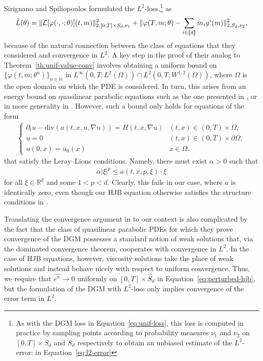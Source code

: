 \documentclass[11pt,reqno]{amsart}
\numberwithin{equation}{section}
\theoremstyle{plain}
\newcommand{\R}{\mathbb{R}}
\newcommand{\sL}{\mathcal{L}}
\newcommand{\N}{\mathbb{N}}
\newcommand{\lbrs}[1]{\llbracket #1 \rrbracket}
\begin{document}
Sirignano and Spiliopoulos \cite{dgm} formulated the $L^2$-loss,\footnote{As with the DGM loss in Equation~\eqref{eq:unif-loss}, this loss is computed in practice by sampling points according to probability measures $\nu_1$ and $\nu_2$ on $[0, T] \times S_d$ and $S_d$ respectively to obtain an unbiased estimate of the $L^2$-error: in Equation~\eqref{eq:l2-error}} as
\begin{align}
\label{eq:l2-error}
    \Tilde{L}(\theta) = \|\sL[\varphi(\cdot, \cdot; \theta)](t,m)\|_{2, [0, T] \times S_d, \nu_1}^2 + \|\varphi(T, m; \theta) - \sum_{i \in \lbrs{d}} m_i g^i(m)\|_{2, S_d, \nu_2}^2,
\end{align}
because of the natural connection between the class of equations that they considered and convergence in $L^2$. A key step in the proof of their analog to Theorem~\ref{th:unif-value-conv} involves obtaining a uniform bound on $\{\varphi(t, m; \theta^n)\}_{n \in \N}$ in $L^\infty(0, T; L^2(\Omega)) \cap L^2(0, T; W^{1,2}(\Omega))$, where $\Omega$ is the open domain on which the PDE is considered. In turn, this arises from an energy bound on quasilinear parabolic equations such as the one presented in \cite{energy-est-orig}, or in more generality in \cite{parabolic-est}. However, such a bound only holds for equations of the form
\begin{align*}
\begin{cases}
    \partial_t u - \text{div}(a(t,x, u, \nabla u)) = H(t,x, \nabla u) & (t,x) \in (0,T) \times \Omega, \\
    u = 0 & (t,x) \in (0,T) \times \partial \Omega, \\
    u(0,x) = u_0(x) & x \in \Omega.
\end{cases}
\end{align*}
that satisfy the Leray--Lions conditions. Namely, there must exist $\alpha > 0$ such that
\begin{align*}
    \alpha|\xi|^p \leq a(t,x, p, \xi) \cdot \xi
\end{align*}
for all $\xi \in \R^d$ and some $1 < p < d$. Clearly, this fails in our case, where $a$ is identically zero, even though our HJB equation otherwise satisfies the structure conditions in \cite{parabolic-est}.

Translating the convergence argument in \cite[Theorem 7.3]{dgm} to our context is also complicated by the fact that the class of quasilinear parabolic PDEs for which they prove convergence of the DGM possesses a standard notion of weak solutions that, via the dominated convergence theorem, cooperates with convergence in $L^2$. In the case of HJB equations, however, viscosity solutions take the place of weak solutions and instead behave nicely with respect to uniform convergence. Thus, we require that $\widehat{e^n} \to 0$ uniformly on $[0, T] \times \widehat{S}_d$ in Equation~\eqref{eq:perturbed-hjb}, but the formulation of the DGM with $L^2$-loss only implies convergence of the error term in $L^2$.
\end{document}
